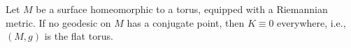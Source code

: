 Let $M$ be a surface homeomorphic to a torus, equipped with a Riemannian metric. If no geodesic on $M$ has a conjugate point, then $K \equiv 0$ everywhere, i.e., $(M, g)$ is the flat torus.